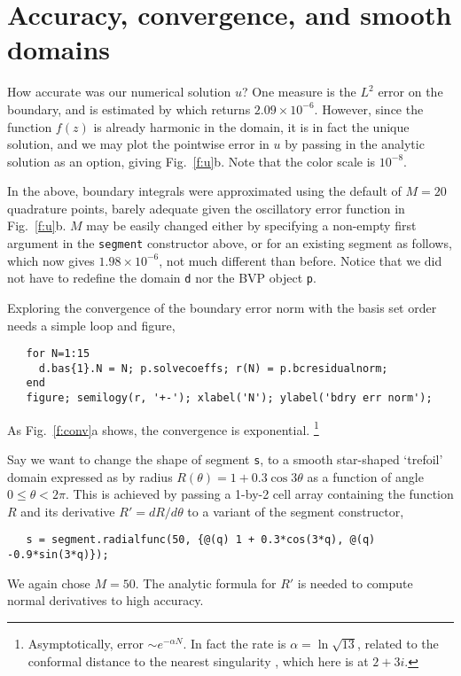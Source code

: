 \documentclass[11pt]{article}
\begin{document}
\section{Accuracy, convergence, and smooth domains}

How accurate was our numerical solution $u$? One measure is the
$L^2$ error on the boundary, and is estimated by
which returns $2.09 \times 10^{-6}$.
However, since the function $f(z)$ is already harmonic in the domain,
it is in fact the unique solution, and we may plot the
pointwise error in $u$ by passing in the analytic solution as an option,
giving Fig.~\ref{f:u}b. Note that the color scale is $10^{-8}$.

In the above, boundary integrals were approximated using the default of
$M=20$ quadrature points, barely adequate given the
oscillatory error function in Fig.~\ref{f:u}b.
$M$ may be easily changed either by specifying
a non-empty first argument in the {\tt segment} constructor above, or
for an existing segment as follows,
which now gives $1.98\times 10^{-6}$, not much different than before.
Notice that we did not have to redefine the domain {\tt d} nor
the BVP object {\tt p}.

Exploring the convergence of the boundary error norm with the basis set order
needs a simple loop and figure,
\begin{verbatim}
   for N=1:15
     d.bas{1}.N = N; p.solvecoeffs; r(N) = p.bcresidualnorm;
   end
   figure; semilogy(r, '+-'); xlabel('N'); ylabel('bdry err norm');
\end{verbatim}
As Fig.~\ref{f:conv}a shows, the convergence is exponential.%
  \footnote{Asymptotically, error $\sim e^{-\alpha N}$. In fact the rate is
    $\alpha = \ln \sqrt{13}$, related to the conformal distance to
    the nearest singularity \cite{timothesis}, which here is at $2+3i$.}

Say we want to change the shape of segment {\tt s}, to
a smooth star-shaped `trefoil' domain expressed as by radius $R(\theta) =
1 + 0.3\cos 3\theta$ as a function of angle $0\le \theta< 2\pi$.
This is achieved by passing a 1-by-2
cell array containing the function $R$ and its
derivative $R' = dR/d\theta$ to a variant of the segment constructor,
\begin{verbatim}
   s = segment.radialfunc(50, {@(q) 1 + 0.3*cos(3*q), @(q) -0.9*sin(3*q)});
\end{verbatim}
We again chose $M=50$.
The analytic formula for $R'$ is needed to compute normal derivatives
to high accuracy.
\end{document}
